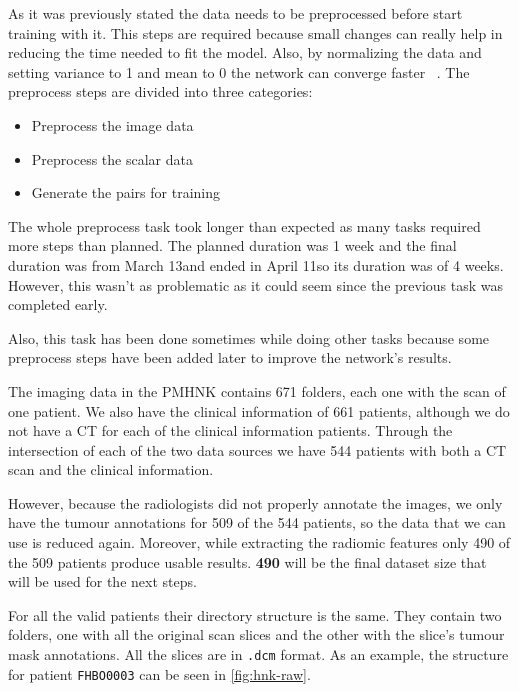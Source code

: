



As it was previously stated the data needs to be preprocessed before start training with it.
This steps are required because small changes can really help in reducing the time needed to
fit the model. Also, by normalizing the data and setting variance to 1 and mean to 0 the network
can converge faster ~\cite{neural:efficient-backprop}. 
The preprocess steps are divided into three categories:
\begin{itemize}
  \item Preprocess the image data
  \item Preprocess the scalar data
  \item Generate the pairs for training
\end{itemize}

The whole preprocess task took longer than expected as many tasks required more steps than 
planned. The planned duration was 1 week and the final duration was from March 13\Th and
ended in April 11\Th so its duration was of 4 weeks. However, this wasn't as problematic as 
it could seem since the previous task was completed early.

Also, this task has been done sometimes while doing other tasks because some preprocess 
steps have been added later to improve the network's results.


The imaging data in the \Gls{PMHNK} contains 671 folders, each one with the scan of one patient. 
We also have the clinical information of 661 patients, although we do not have a \gls{CT} for
each of the clinical information patients. Through the intersection of each of the two data
sources we have 544 patients with both a \gls{CT} scan and the clinical information.

However, because the radiologists did not properly annotate the images, we only have
the tumour annotations for 509 of the 544 patients, so the data that we can use is reduced
again. Moreover, while extracting the radiomic features only 490 of the 509 patients produce 
usable results. \textbf{490} will be the final dataset size that will be used for the next 
steps.

For all the valid patients their directory structure is the same. They contain two folders,
one with all the original scan slices and the other with the slice's tumour mask annotations. 
All the slices are in \verb|.dcm| format.
As an example, the structure for patient \texttt{FHBO0003} can be seen in \autoref{fig:hnk-raw}.

